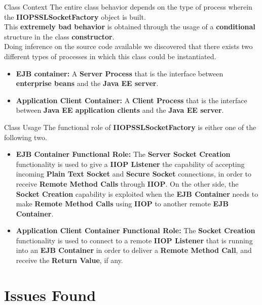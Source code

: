 \documentclass{../common/latex_classes/pdf_presentation}
\begin{document}
		\begin{frame}{Class Context}
			The entire class behavior depends on the type of process wherein the \textbf{IIOPSSLSocketFactory} object is built.\\
			This \textbf{extremely bad behavior} is obtained through the usage of a \textbf{conditional} structure in the class \textbf{constructor}.\\
			Doing inference on the source code available we discovered that there exists two different types of processes in which this class could be instantiated.
			\begin{itemize}
				\item \textbf{EJB container:}
					A \textbf{Server Process} that is the interface between \textbf{enterprise beans} and the \textbf{Java EE server}.
				\item \textbf{Application Client Container:}
					A \textbf{Client Process} that is the interface between \textbf{Java EE application clients} and the \textbf{Java EE server}.
			\end{itemize}			
		\end{frame}
			
		\begin{frame}{Class Usage}
			The functional role of \textbf{IIOPSSLSocketFactory} is either one of the following two.
			\begin{itemize}
				\item \textbf{EJB Container Functional Role:}
					The \textbf{Server Socket Creation} functionality is used to give a \textbf{IIOP Listener} the capability of accepting incoming \textbf{Plain Text Socket} and \textbf{Secure Socket} connections, in order to receive \textbf{Remote Method Calls} through \textbf{IIOP}.
					On the other side, the \textbf{Socket Creation} capability is exploited when the \textbf{EJB Container} needs to make \textbf{Remote Method Calls} using \textbf{IIOP} to another remote \textbf{EJB Container}.
				\item \textbf{Application Client Container Functional Role:}
					The \textbf{Socket Creation} functionality is used to connect to a remote \textbf{IIOP Listener} that is running into an \textbf{EJB Container} in order to deliver a \textbf{Remote Method Call}, and receive the \textbf{Return Value}, if any.
			\end{itemize}
		\end{frame}
	
	\section{Issues Found}
	
\end{document}
